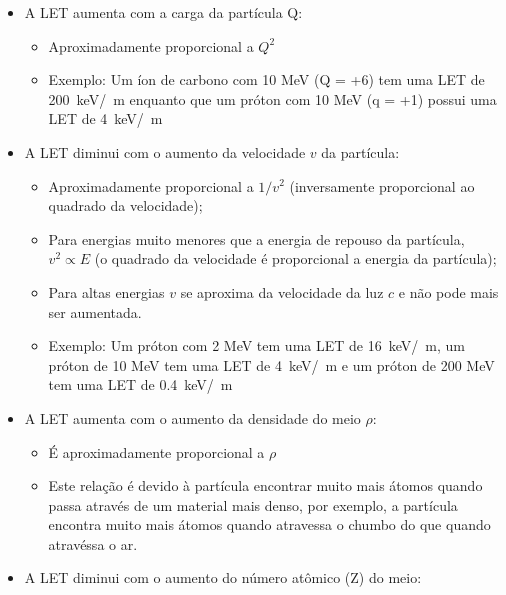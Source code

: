 \documentclass[11pt,a4paper]{article}
\newcounter{exemplo}
\begin{document}
    \begin{itemize}
		\item A LET aumenta com a carga da partícula Q: 
			
			\begin{itemize}
				\item Aproximadamente proporcional a $Q^2$
					
				\item Exemplo: Um íon de carbono com 10 MeV (Q = +6) tem uma LET de \qty{200}{keV/\mu m} enquanto que um próton com 10 MeV (q = +1) possui uma LET de \qty{4}{keV/\mu m}
			\end{itemize}

		\item A LET diminui com o aumento da velocidade $v$ da partícula:
			
			\begin{itemize}
				\item Aproximadamente proporcional a $1/v^2$ (inversamente proporcional ao quadrado da velocidade);
					
				\item Para energias muito menores que a energia de repouso da partícula, $v^2 \propto E$ (o quadrado da velocidade é proporcional a energia da partícula);
					
				\item Para altas energias $v$ se aproxima da velocidade da luz $c$ e não pode mais ser aumentada.
					
				\item Exemplo: Um próton com 2 MeV tem uma LET de \qty{16}{keV/\mu m}, um próton de 10 MeV tem uma LET de \qty{4}{keV/\mu m} e um próton de 200 MeV tem uma LET de \qty{0.4}{keV/\mu m}
			\end{itemize}

		\item A LET aumenta com o aumento da densidade do meio $\rho$:
			
			\begin{itemize}
				\item É aproximadamente proporcional a $\rho$
				\item Este relação é devido à partícula encontrar muito mais átomos quando passa através de um material mais denso, por exemplo, a partícula encontra muito mais átomos quando atravessa o chumbo do que quando atravéssa o ar. 
			\end{itemize}

		\item A LET diminui com o aumento do número atômico (Z) do meio:
			

\end{itemize}
\end{document}
